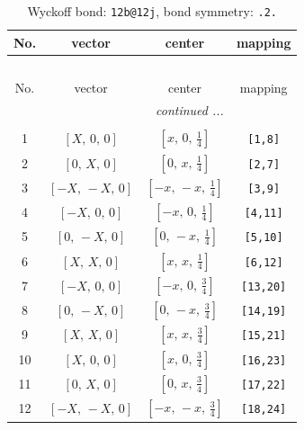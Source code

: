 \documentclass[fleqn,8pt]{jsarticle}
\begin{document}
\renewcommand{\arraystretch}{1.2}
\begin{longtable}{cccc}
\caption{Wyckoff bond: {\tt 12b@12j}, bond symmetry: {\tt .2.}}
 \\
 \hline \hline
No. & vector & center & mapping \\ \hline \endfirsthead

\multicolumn{3}{l}{\tablename\ \thetable{}} \\
 \hline \hline
No. & vector & center & mapping \\ \hline \endhead

 \hline \hline
\multicolumn{3}{r}{\footnotesize\it continued ...} \\ \endfoot

 \hline \hline
\multicolumn{3}{r}{} \\ \endlastfoot

1 & $\left[ X,\, 0,\, 0 \right]$ & $\left[ x,\, 0,\, \frac{1}{4} \right]$ & {\tt [1,8]} \\ \hline
2 & $\left[ 0,\, X,\, 0 \right]$ & $\left[ 0,\, x,\, \frac{1}{4} \right]$ & {\tt [2,7]} \\ \hline
3 & $\left[ - X,\, - X,\, 0 \right]$ & $\left[ - x,\, - x,\, \frac{1}{4} \right]$ & {\tt [3,9]} \\ \hline
4 & $\left[ - X,\, 0,\, 0 \right]$ & $\left[ - x,\, 0,\, \frac{1}{4} \right]$ & {\tt [4,11]} \\ \hline
5 & $\left[ 0,\, - X,\, 0 \right]$ & $\left[ 0,\, - x,\, \frac{1}{4} \right]$ & {\tt [5,10]} \\ \hline
6 & $\left[ X,\, X,\, 0 \right]$ & $\left[ x,\, x,\, \frac{1}{4} \right]$ & {\tt [6,12]} \\ \hline
7 & $\left[ - X,\, 0,\, 0 \right]$ & $\left[ - x,\, 0,\, \frac{3}{4} \right]$ & {\tt [13,20]} \\ \hline
8 & $\left[ 0,\, - X,\, 0 \right]$ & $\left[ 0,\, - x,\, \frac{3}{4} \right]$ & {\tt [14,19]} \\ \hline
9 & $\left[ X,\, X,\, 0 \right]$ & $\left[ x,\, x,\, \frac{3}{4} \right]$ & {\tt [15,21]} \\ \hline
10 & $\left[ X,\, 0,\, 0 \right]$ & $\left[ x,\, 0,\, \frac{3}{4} \right]$ & {\tt [16,23]} \\ \hline
11 & $\left[ 0,\, X,\, 0 \right]$ & $\left[ 0,\, x,\, \frac{3}{4} \right]$ & {\tt [17,22]} \\ \hline
12 & $\left[ - X,\, - X,\, 0 \right]$ & $\left[ - x,\, - x,\, \frac{3}{4} \right]$ & {\tt [18,24]} \\
\end{longtable}
\end{document}
